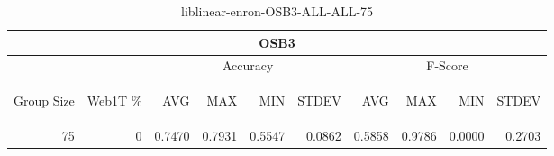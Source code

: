 \begin{center}
\begin{table}[htbp]
\begin{tabular}{ | r | r | r | r | r | r | r | r | r | r |}
\hline
\multicolumn{10}{|c|}{OSB3}\\
\hline
 & & \multicolumn{4}{|c|}{Accuracy} & \multicolumn{4}{|c|}{F-Score}\\ \cline{3-10}
\begin{sideways}Group Size\end{sideways} & \begin{sideways}Web1T \%\end{sideways} & \begin{sideways}AVG\end{sideways} & \begin{sideways}MAX\end{sideways} & \begin{sideways}MIN\end{sideways} & \begin{sideways}STDEV\end{sideways} & \begin{sideways}AVG\end{sideways} & \begin{sideways}MAX\end{sideways} & \begin{sideways}MIN\end{sideways} & \begin{sideways}STDEV\end{sideways}\\
\hline
\multirow{0}{*}{75}
 & 0 & 0.7470 & 0.7931 & 0.5547 & 0.0862 & 0.5858 & 0.9786 & 0.0000 & 0.2703\\ \cline{2-10}
\hline
\end{tabular}
\caption{liblinear-enron-OSB3-ALL-ALL-75}
\label{table:liblinear-enron-OSB3-ALL-ALL-75}
\end{table}
\end{center}


